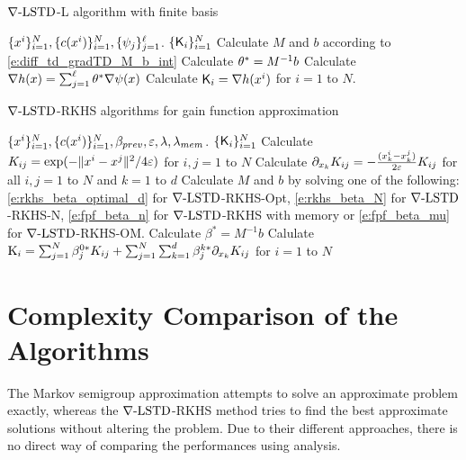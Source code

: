 \begin{algorithm}{$\nabla\text{-LSTD}$-L algorithm with finite basis}
	\begin{algorithmic}[1]
		\Require $\{x^i\}_{i=1}^N, \{c(x^i)\}_{i=1}^N, \{\psi_j\}_{j=1}^{\ell}$.
		\Ensure $\{\text{\sf K}_i\}_{i=1}^N$
		\State Calculate $M$ and $b$ according to \eqref{e:diff_td_gradTD_M_b_int}
		\State Calculate $\theta^* = M^{-1}b$
		\State Calculate $\nabla h(x)  =  \sum_{j=1}^{\ell}  \theta^* \nabla \psi(x)$  
		\State Calculate $\text{\sf K}_i = \nabla h(x^i)$ for $i=1$ to $N$. 
	\end{algorithmic}
\end{algorithm} 


\label{alg:rkhs}
\begin{algorithm}{$\nabla\text{-LSTD}$-RKHS algorithms for gain function approximation}
	\begin{algorithmic}[1]
		\Require $\{x^i\}_{i=1}^N, \{c(x^i)\}_{i=1}^N, \beta_{prev}, \varepsilon, \lambda, \lambda_{mem}$.
		\Ensure $\{\text{\sf K}_i\}_{i=1}^N$
		\State Calculate $K_{ij} = \exp(-\|x^i - x^j\|^2/ 4\varepsilon)$ for $i,j = 1$ to $N$  
		\State Calculate $ \partial_{x_k}K_{ij} = -\frac{(x_k^i - x_k^j)}{2\varepsilon} K_{ij}$ for all $i,j =1$ to $N$ and $k = 1$ to $d$ 
		\State Calculate $M$ and $b$ by solving one of the following: \eqref{e:rkhs_beta_optimal_d} for $\nabla\text{-LSTD}$-RKHS-Opt, \eqref{e:rkhs_beta_N} for $\nabla\text{-LSTD}$-RKHS-N, \eqref{e:fpf_beta_n} for $\nabla\text{-LSTD}$-RKHS with memory or \eqref{e:fpf_beta_mu} for $\nabla\text{-LSTD}$-RKHS-OM.  
		\State Calculate $\beta^* = M^{-1}b$
		\State Calulate $\text{K}_i  =  \sum_{j=1}^N  \beta^{0*}_j K_{ij} + \sum_{j=1}^N \sum_{k=1}^d \beta^{k*}_j \partial_{x_k} K_{ij}$ for $i =1$ to $N$ 
	\end{algorithmic}
\end{algorithm} %

\section{Complexity Comparison of the Algorithms}
\label{s:computational_complexity}
The Markov semigroup approximation attempts to solve an approximate problem exactly, whereas the $\nabla\text{-LSTD}$-RKHS method tries to find the best approximate solutions without altering the problem. Due to their different approaches, there is no direct way of comparing the performances using analysis. %

